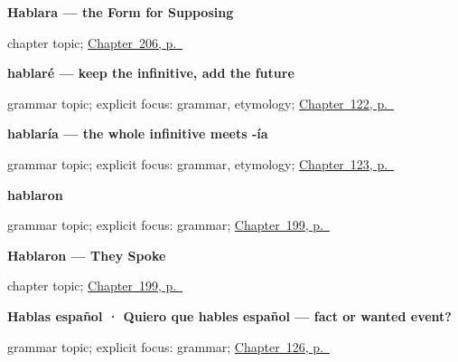 \noindent\begin{minipage}[t]{\linewidth}
\raggedright
\textbf{Hablara --- the Form for Supposing}\par
\footnotesize chapter topic; \hyperref[ch:hablara]{Chapter~206, p.~\pageref*{ch:hablara}}
\end{minipage}\par\smallskip

\noindent\begin{minipage}[t]{\linewidth}
\raggedright
\textbf{hablaré — keep the infinitive, add the future}\par
\footnotesize grammar topic; explicit focus: grammar, etymology; \hyperref[ch:spanish-futuro]{Chapter~122, p.~\pageref*{ch:spanish-futuro}}
\end{minipage}\par\smallskip

\noindent\begin{minipage}[t]{\linewidth}
\raggedright
\textbf{hablaría — the whole infinitive meets -ía}\par
\footnotesize grammar topic; explicit focus: grammar, etymology; \hyperref[ch:spanish-condicional]{Chapter~123, p.~\pageref*{ch:spanish-condicional}}
\end{minipage}\par\smallskip

\noindent\begin{minipage}[t]{\linewidth}
\raggedright
\textbf{hablaron}\par
\footnotesize grammar topic; explicit focus: grammar; \hyperref[ch:hablaron]{Chapter~199, p.~\pageref*{ch:hablaron}}
\end{minipage}\par\smallskip

\noindent\begin{minipage}[t]{\linewidth}
\raggedright
\textbf{Hablaron --- They Spoke}\par
\footnotesize chapter topic; \hyperref[ch:hablaron]{Chapter~199, p.~\pageref*{ch:hablaron}}
\end{minipage}\par\smallskip

\noindent\begin{minipage}[t]{\linewidth}
\raggedright
\textbf{Hablas español · Quiero que hables español — fact or wanted event?}\par
\footnotesize grammar topic; explicit focus: grammar; \hyperref[ch:spanish-quiero-que]{Chapter~126, p.~\pageref*{ch:spanish-quiero-que}}
\end{minipage}\par\smallskip

